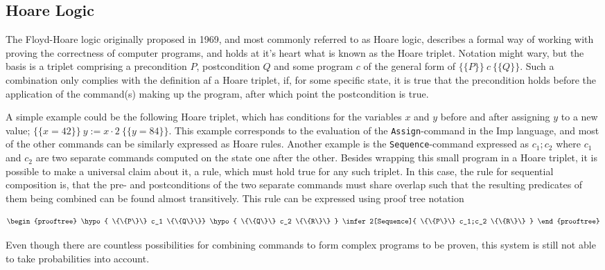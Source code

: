 \subsection{Hoare Logic} \label{backgroundHoare}
The Floyd-Hoare logic originally proposed in 1969, and most commonly referred to as Hoare logic, describes a formal way of working with proving the correctness of computer programs, and holds at it's heart what is known as the Hoare triplet. Notation might wary, but the basis is a triplet comprising a precondition $P$, postcondition $Q$ and some program $c$ of the general form of $\{\{P\}\}\ c\ \{\{Q\}\}$. Such a combination only complies with the definition af a Hoare triplet, if, for some specific state, it is true that the precondition holds before the application of the command(s) making up the program, after which point the postcondition is true.

A simple example could be the following Hoare triplet, which has conditions for the variables $x$ and $y$ before and after assigning $y$ to a new value; $\{\{x=42\}\}\ y:= x\cdot2\ \{\{y=84\}\}$. This example corresponds to the evaluation of the \texttt{Assign}-command in the Imp language, and most of the other commands can be similarly expressed as Hoare rules. 
Another example is the \texttt{Sequence}-command expressed as $c_1 ; c_2$ where $c_1$ and $c_2$ are two separate commands computed on the state one after the other. Besides wrapping this small program in a Hoare triplet, it is possible to make a universal claim about it, a rule, which must hold true for any such triplet. In this case, the rule for sequential composition is, that the pre- and postconditions of the two separate commands must share overlap such that the resulting predicates of them being combined can be found almost transitively. This rule can be expressed using proof tree notation 

\[
\begin{prooftree}
\hypo{ \{\{P\}\} c_1 \{\{Q\}\}}
\hypo{ \{\{Q\}\} c_2 \{\{R\}\} }
\infer2[Sequence]{ \{\{P\}\} c_1;c_2 \{\{R\}\} }
\end{prooftree}
\]

Even though there are countless possibilities for combining commands to form complex programs to be proven, this system is still not able to take probabilities into account.



